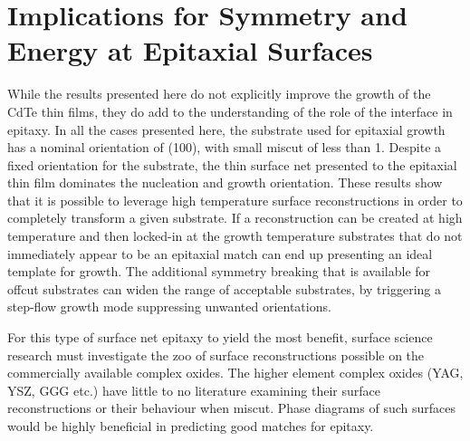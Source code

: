 \section{Implications for Symmetry and Energy at Epitaxial Surfaces}
While the results presented here do not explicitly improve the growth of the CdTe thin films, they do add to the understanding of the role of the interface in epitaxy.
In all the cases presented here, the substrate used for epitaxial growth has a nominal orientation of (100), with small miscut of less than 1\degree{}.
Despite a fixed orientation for the substrate, the thin surface net presented to the epitaxial thin film dominates the nucleation and growth orientation.
These results show that it is possible to leverage high temperature surface reconstructions in order to completely transform a given substrate.
If a reconstruction can be created at high temperature and then locked-in at the growth temperature substrates that do not immediately appear to be an epitaxial match can end up presenting an ideal template for growth.
The additional symmetry breaking that is available for offcut substrates can widen the range of acceptable substrates, by triggering a step-flow growth mode suppressing unwanted orientations.

For this type of surface net epitaxy to yield the most benefit, surface science research must investigate the zoo of surface reconstructions possible on the commercially available complex oxides.
The higher element complex oxides (YAG, YSZ, GGG etc.) have little to no literature examining their surface reconstructions or their behaviour when miscut.
Phase diagrams of such surfaces would be highly beneficial in predicting good matches for epitaxy.
